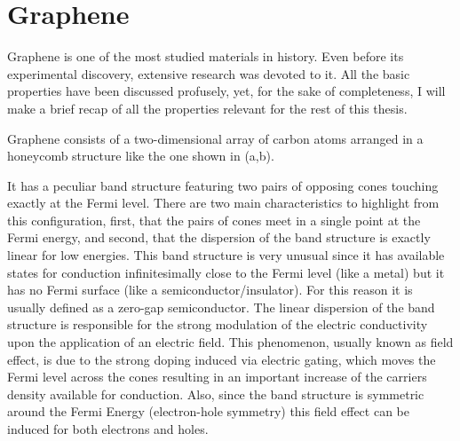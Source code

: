 \chapter{Graphene}
\label{ch:graphene}

%
%

Graphene is one of the most studied materials in history\cite{KatsnelsonBook, Geim2007, Murakami2009, CastroNeto2009a, Mas-Balleste2011, Konschuh2011a, Cooper2012, Han2014, Sadurni2014, Rozhkov2016}.
Even before its experimental discovery\cite{Novoselov2004, Novoselov2005}, extensive research was devoted to it\cite{Wallace1947, VanBommel1975, Semenoff1984, Haldane1988, Forbeaux1998, Oshima2000}.
All the basic properties have been discussed profusely, yet, for the sake of completeness, I will make a brief recap of all the properties relevant for the rest of this thesis.
\medskip


Graphene consists of a two-dimensional array of carbon atoms arranged in a honeycomb structure\cite{Huang2011} %
like the one shown in (a,b).

It has a peculiar band structure featuring two pairs of opposing cones touching exactly at the Fermi level. There are two main characteristics to highlight from this configuration, first, that the pairs of cones meet in a single point at the Fermi energy, and second, that the dispersion of the band structure is exactly linear for low energies.
This band structure is very unusual since it has available states for conduction infinitesimally close to the Fermi level (like a metal) but it has no Fermi surface (like a semiconductor/insulator). For this reason it is usually defined as a zero-gap semiconductor.
The linear dispersion of the band structure is responsible for the strong modulation of the electric conductivity upon the application of an electric field. This phenomenon, usually known as field effect, is due to the strong doping induced via electric gating, which moves the Fermi level across the cones resulting in an important increase of the carriers density available for conduction. Also, since the band structure is symmetric around the Fermi Energy (electron-hole symmetry) this field effect can be induced for both electrons and holes.
\medskip

